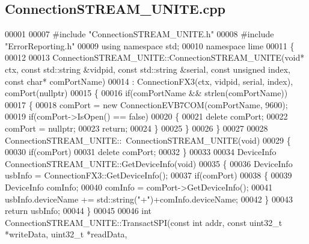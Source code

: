 \subsection{Connection\+S\+T\+R\+E\+A\+M\+\_\+\+U\+N\+I\+T\+E.\+cpp}
\label{ConnectionSTREAM__UNITE_8cpp_source}

\begin{DoxyCode}
00001 
00007 \textcolor{preprocessor}{#include "ConnectionSTREAM_UNITE.h"}
00008 \textcolor{preprocessor}{#include "ErrorReporting.h"}
00009 \textcolor{keyword}{using namespace }std;
00010 \textcolor{keyword}{namespace }lime
00011 \{
00012 
00013 ConnectionSTREAM\_UNITE::ConnectionSTREAM\_UNITE(\textcolor{keywordtype}{void}* ctx, \textcolor{keyword}{const} std::string &vidpid, \textcolor{keyword}{const} 
      std::string &serial, \textcolor{keyword}{const} \textcolor{keywordtype}{unsigned} index, \textcolor{keyword}{const} \textcolor{keywordtype}{char}* comPortName)
00014     : ConnectionFX3(ctx, vidpid, serial, index), comPort(nullptr)
00015 \{
00016     \textcolor{keywordflow}{if}(comPortName && strlen(comPortName))
00017     \{
00018         comPort = \textcolor{keyword}{new} ConnectionEVB7COM(comPortName, 9600);
00019         \textcolor{keywordflow}{if}(comPort->IsOpen() == \textcolor{keyword}{false})
00020         \{
00021             \textcolor{keyword}{delete} comPort;
00022             comPort = \textcolor{keyword}{nullptr};
00023             \textcolor{keywordflow}{return};
00024         \}
00025     \}
00026 \}
00027 
00028 ConnectionSTREAM_UNITE::~ConnectionSTREAM_UNITE(\textcolor{keywordtype}{void})
00029 \{
00030     \textcolor{keywordflow}{if}(comPort)
00031         \textcolor{keyword}{delete} comPort;
00032 \}
00033 
00034 DeviceInfo ConnectionSTREAM_UNITE::GetDeviceInfo(\textcolor{keywordtype}{void})
00035 \{
00036     DeviceInfo usbInfo = ConnectionFX3::GetDeviceInfo();
00037     \textcolor{keywordflow}{if}(comPort)
00038     \{
00039         DeviceInfo comInfo;
00040         comInfo = comPort->GetDeviceInfo();
00041         usbInfo.deviceName += std::string(\textcolor{stringliteral}{"+"})+comInfo.deviceName;
00042     \}
00043     \textcolor{keywordflow}{return} usbInfo;
00044 \}
00045 
00046 \textcolor{keywordtype}{int} ConnectionSTREAM_UNITE::TransactSPI(\textcolor{keyword}{const} \textcolor{keywordtype}{int} addr, \textcolor{keyword}{const} uint32\_t *writeData, uint32\_t *readData, \textcolor{keyword}{
}
\end{DoxyCode}
